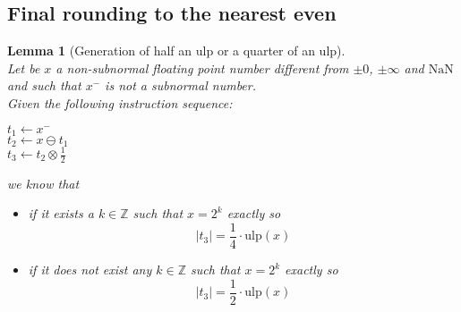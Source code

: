 \documentclass[a4paper,10pt,twoside]{article}
\newtheorem{lemma}[theorem]{Lemma}
\newcommand{\Z}{\ensuremath{\mathbb {Z}}}
\newcommand{\mUlp}{\ensuremath{\mathrm{ulp}}}
\newcommand{\nan}{\ensuremath{\mathrm{NaN}}}
\begin{document}
\subsection{Final rounding to the nearest even}
\begin{lemma}[Generation of half an $\mUlp$ or a quarter of an $\mUlp$] \label{genmiquartulp} ~\\
Let be $x$ a non-subnormal floating point number different from $\pm 0$, $\pm \infty$ and $\nan$ and such that $x^-$
is not a subnormal number. \\
Given the following instruction sequence:
\begin{center}
$t_1 \gets x^-$ \\
$t_2 \gets x \ominus t_1$ \\
$t_3 \gets t_2 \otimes \frac{1}{2}$
\end{center}
we know that
\begin{itemize}
\item if it exists a $k \in \Z$ such that $x=2^k$ exactly so
$$\left \vert t_3 \right \vert = \frac{1}{4} \cdot \mUlp \left( x \right)$$
\item if it does not exist any $k \in \Z$ such that $x=2^k$ exactly so
$$\left \vert t_3 \right \vert = \frac{1}{2} \cdot \mUlp \left( x \right)$$
\end{itemize}
\end{lemma}
\end{document}
